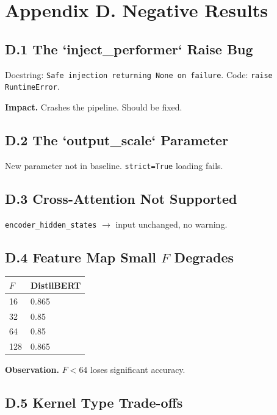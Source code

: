 
\section{Appendix D. Negative Results}

\subsection{D.1 The `inject\_performer` Raise Bug}

Docstring: \texttt{Safe injection returning None on failure}. Code: \texttt{raise RuntimeError}.

\textbf{Impact.} Crashes the pipeline. Should be fixed.

\subsection{D.2 The `output\_scale` Parameter}

New parameter not in baseline. \texttt{strict=True} loading fails.

\subsection{D.3 Cross-Attention Not Supported}

\texttt{encoder\_hidden\_states} $\to$ input unchanged, no warning.

\subsection{D.4 Feature Map Small $F$ Degrades}

\begin{table}[H]
\centering
\small
\begin{tabular}{ll}
\toprule
\textbf{$F$} & \textbf{DistilBERT} \\
\midrule
16 & 0.865 \\
32 & 0.85 \\
64 & 0.85 \\
128 & 0.865 \\
\bottomrule
\end{tabular}
\end{table}

\textbf{Observation.} $F < 64$ loses significant accuracy.

\subsection{D.5 Kernel Type Trade-offs}

